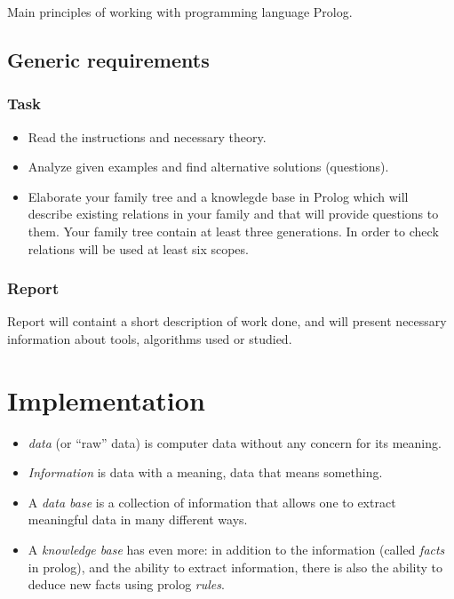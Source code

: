 \documentclass[12pt]{article}
\begin{document}
  Main principles of working with programming language Prolog.

  \subsection{Generic requirements}

  \subsubsection{Task}

  \begin{itemize}
    \item Read the instructions and  necessary theory.
    \item Analyze given examples and find alternative solutions (questions).
    \item Elaborate your family tree and a knowlegde base in Prolog which will
    describe existing relations in your family and that will provide questions to them.
    Your family tree contain at least three generations. In order to check relations will
    be used at least six scopes.
  \end{itemize}

  \subsubsection{Report}

  Report will containt a short description of work done, and will present necessary information
  about tools, algorithms used or studied.


  \section{Implementation}

    \begin{itemize}
      \renewcommand{\labelitemi}{$\circ$}
      \item \textit{data}  (or ``raw'' data) is computer data without any concern for its meaning.
      \item \textit{Information} is data with a meaning, data that means something.
      \item A \textit{data base} is a collection of information that allows one to extract meaningful data in many different ways.
      \item A \textit{knowledge base} has even more: in addition to the information (called \textit{facts} in prolog), and the ability to extract information,
      there is also the ability to deduce new facts using prolog \textit{rules}.
    \end{itemize}
\end{document}
